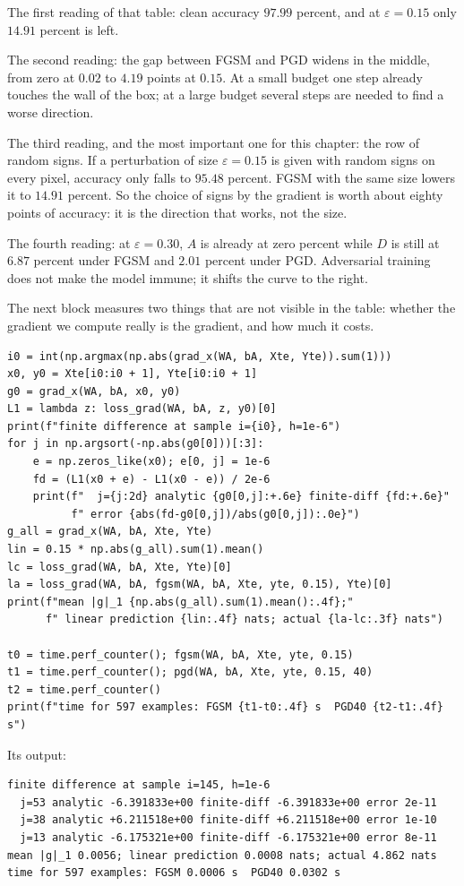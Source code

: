 The first reading of that table: clean accuracy $97.99$ percent, and at
$\varepsilon=0.15$ only $14.91$ percent is left.

The second reading: the gap between FGSM and PGD widens in the middle, from zero at
$0.02$ to $4.19$ points at $0.15$. At a small budget one step already touches the
wall of the box; at a large budget several steps are needed to find a worse
direction.

The third reading, and the most important one for this chapter: the row of random
signs. If a perturbation of size $\varepsilon=0.15$ is given with random signs on
every pixel, accuracy only falls to $95.48$ percent. FGSM with the same size lowers it
to $14.91$ percent. So the choice of signs by the gradient is worth about eighty
points of accuracy: it is the direction that works, not the size.

The fourth reading: at $\varepsilon=0.30$, $A$ is already at zero percent while $D$ is
still at $6.87$ percent under FGSM and $2.01$ percent under PGD. Adversarial training
does not make the model immune; it shifts the curve to the right.

The next block measures two things that are not visible in the table: whether the
gradient we compute really is the gradient, and how much it costs.

\begin{verbatim}
i0 = int(np.argmax(np.abs(grad_x(WA, bA, Xte, Yte)).sum(1)))
x0, y0 = Xte[i0:i0 + 1], Yte[i0:i0 + 1]
g0 = grad_x(WA, bA, x0, y0)
L1 = lambda z: loss_grad(WA, bA, z, y0)[0]
print(f"finite difference at sample i={i0}, h=1e-6")
for j in np.argsort(-np.abs(g0[0]))[:3]:
    e = np.zeros_like(x0); e[0, j] = 1e-6
    fd = (L1(x0 + e) - L1(x0 - e)) / 2e-6
    print(f"  j={j:2d} analytic {g0[0,j]:+.6e} finite-diff {fd:+.6e}"
          f" error {abs(fd-g0[0,j])/abs(g0[0,j]):.0e}")
g_all = grad_x(WA, bA, Xte, Yte)
lin = 0.15 * np.abs(g_all).sum(1).mean()
lc = loss_grad(WA, bA, Xte, Yte)[0]
la = loss_grad(WA, bA, fgsm(WA, bA, Xte, yte, 0.15), Yte)[0]
print(f"mean |g|_1 {np.abs(g_all).sum(1).mean():.4f};"
      f" linear prediction {lin:.4f} nats; actual {la-lc:.3f} nats")

t0 = time.perf_counter(); fgsm(WA, bA, Xte, yte, 0.15)
t1 = time.perf_counter(); pgd(WA, bA, Xte, yte, 0.15, 40)
t2 = time.perf_counter()
print(f"time for 597 examples: FGSM {t1-t0:.4f} s  PGD40 {t2-t1:.4f} s")
\end{verbatim}

Its output:

\begin{verbatim}
finite difference at sample i=145, h=1e-6
  j=53 analytic -6.391833e+00 finite-diff -6.391833e+00 error 2e-11
  j=38 analytic +6.211518e+00 finite-diff +6.211518e+00 error 1e-10
  j=13 analytic -6.175321e+00 finite-diff -6.175321e+00 error 8e-11
mean |g|_1 0.0056; linear prediction 0.0008 nats; actual 4.862 nats
time for 597 examples: FGSM 0.0006 s  PGD40 0.0302 s
\end{verbatim}

